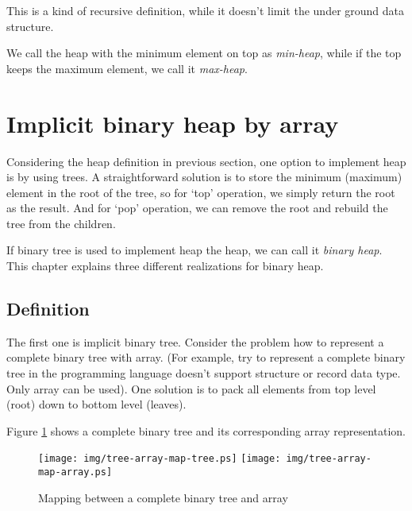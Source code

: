 \documentclass{article}
\begin{document}
This is a kind of recursive definition, while it doesn't limit the under
ground data structure.

We call the heap with the minimum element on top as {\em min-heap},
while if the top keeps the maximum element, we call it {\em max-heap}.

\section{Implicit binary heap by array}
\label{ibheap}

Considering the heap definition in previous section, one option to
implement heap is by using trees. A straightforward solution is
to store the minimum (maximum) element in the root of the
tree, so for `top' operation, we simply return the root as the
result. And for `pop' operation, we can remove the root and
rebuild the tree from the children.

If binary tree is used to implement heap the heap, we
can call it {\em binary heap}. This chapter explains three different
realizations for binary heap.

\subsection{Definition}

The first one is implicit binary tree. Consider the problem
how to represent a complete binary tree with array. (For example, try to
represent a complete binary tree in the programming language doesn't support structure
or record data type. Only array can be used). One solution
is to pack all elements from top level (root) down to bottom level (leaves).

Figure \ref{fig:tree-array-map} shows a complete binary tree and
its corresponding array representation.

\begin{figure}[htbp]
       \begin{center}
       	  \texttt{[image: img/tree-array-map-tree.ps]}
          \texttt{[image: img/tree-array-map-array.ps]}
        \caption{Mapping between a complete binary tree and array} \label{fig:tree-array-map}
       \end{center}
\end{figure}
\end{document}
